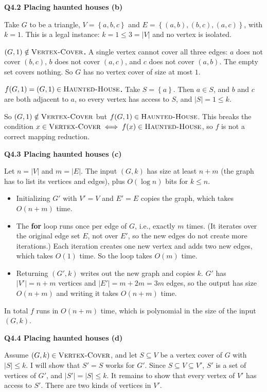 \documentclass[11pt]{article}
\newcommand{\set}[1]{\left\{#1\right\}}
\newcommand{\abs}[1]{\left|#1\right|}
\newcommand{\cproblem}[1]{\textsc{#1}}
\newcommand{\HH}{\cproblem{Haunted-House}}
\newcommand{\VC}{\cproblem{Vertex-Cover}}
\newcommand{\qpage}[1]{\clearpage\noindent\textbf{\large #1}\par\medskip}
\begin{document}
\qpage{Q4.2 Placing haunted houses (b)}

Take $G$ to be a triangle, $V = \set{a, b, c}$ and $E = \set{(a,b), (b,c), (a,c)}$, with $k = 1$.
This is a legal instance: $k = 1 \leq 3 = \abs{V}$ and no vertex is isolated.

\textbf{$(G, 1) \notin \VC$.}
A single vertex cannot cover all three edges: $a$ does not cover $(b, c)$, $b$ does not cover $(a, c)$, and $c$ does not cover $(a, b)$.
The empty set covers nothing.
So $G$ has no vertex cover of size at most $1$.

\textbf{$f(G, 1) = (G, 1) \in \HH$.}
Take $S = \set{a}$.
Then $a \in S$, and $b$ and $c$ are both adjacent to $a$, so every vertex has access to $S$, and $\abs{S} = 1 \leq k$.

So $(G, 1) \notin \VC$ but $f(G, 1) \in \HH$. This breaks the condition $x \in \VC \iff f(x) \in \HH$, so $f$ is not a correct mapping reduction.

\qpage{Q4.3 Placing haunted houses (c)}

Let $n = \abs{V}$ and $m = \abs{E}$.
The input $(G, k)$ has size at least $n + m$ (the graph has to list its vertices and edges), plus $O(\log n)$ bits for $k \leq n$.

\begin{itemize}
  \item Initializing $G'$ with $V' = V$ and $E' = E$ copies the graph, which takes $O(n + m)$ time.
  \item The \textbf{for} loop runs once per edge of $G$, i.e., exactly $m$ times.
  (It iterates over the original edge set $E$, not over $E'$, so the new edges do not create more iterations.)
  Each iteration creates one new vertex and adds two new edges, which takes $O(1)$ time.
  So the loop takes $O(m)$ time.
  \item Returning $(G', k)$ writes out the new graph and copies $k$.
  $G'$ has $\abs{V'} = n + m$ vertices and $\abs{E'} = m + 2m = 3m$ edges, so the output has size $O(n + m)$ and writing it takes $O(n + m)$ time.
\end{itemize}

In total $f$ runs in $O(n + m)$ time, which is polynomial in the size of the input $(G, k)$.

\qpage{Q4.4 Placing haunted houses (d)}

Assume $(G, k) \in \VC$, and let $S \subseteq V$ be a vertex cover of $G$ with $\abs{S} \leq k$.
I will show that $S' = S$ works for $G'$.
Since $S \subseteq V \subseteq V'$, $S'$ is a set of vertices of $G'$, and $\abs{S'} = \abs{S} \leq k$.
It remains to show that every vertex of $V'$ has access to $S'$.
There are two kinds of vertices in $V'$.
\end{document}
